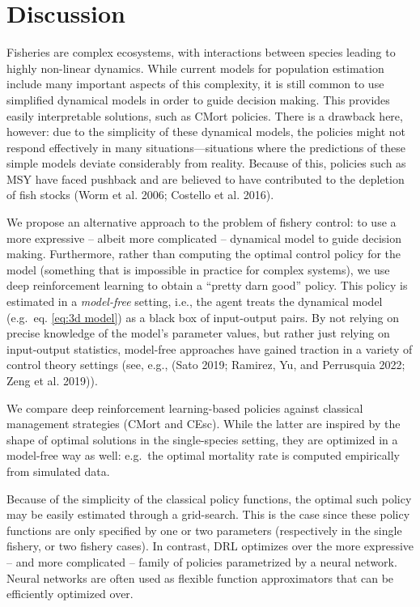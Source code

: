 \documentclass{article}
\begin{document}
\hypertarget{discussion}{%
\section{Discussion}\label{discussion}}

Fisheries are complex ecosystems, with interactions between species
leading to highly non-linear dynamics. While current models for
population estimation include many important aspects of this complexity,
it is still common to use simplified dynamical models in order to guide
decision making. This provides easily interpretable solutions, such as
CMort policies. There is a drawback here, however: due to the simplicity
of these dynamical models, the policies might not respond effectively in
many situations---situations where the predictions of these simple
models deviate considerably from reality. Because of this, policies such
as MSY have faced pushback and are believed to have contributed to the
depletion of fish stocks (Worm et al. 2006; Costello et al. 2016).

We propose an alternative approach to the problem of fishery control: to
use a more expressive -- albeit more complicated -- dynamical model to
guide decision making. Furthermore, rather than computing the optimal
control policy for the model (something that is impossible in practice
for complex systems), we use deep reinforcement learning to obtain a
``pretty darn good'' policy. This policy is estimated in a
\emph{model-free} setting, i.e., the agent treats the dynamical model
(e.g.~eq. \eqref{eq:3d model}) as a black box of input-output pairs. By
not relying on precise knowledge of the model's parameter values, but
rather just relying on input-output statistics, model-free approaches
have gained traction in a variety of control theory settings (see, e.g.,
(Sato 2019; Ramirez, Yu, and Perrusquia 2022; Zeng et al. 2019)).

We compare deep reinforcement learning-based policies against classical
management strategies (CMort and CEsc). While the latter are inspired by
the shape of optimal solutions in the single-species setting, they are
optimized in a model-free way as well: e.g.~the optimal mortality rate
is computed empirically from simulated data.

Because of the simplicity of the classical policy functions, the optimal
such policy may be easily estimated through a grid-search. This is the
case since these policy functions are only specified by one or two
parameters (respectively in the single fishery, or two fishery cases).
In contrast, DRL optimizes over the more expressive -- and more
complicated -- family of policies parametrized by a neural network.
Neural networks are often used as flexible function approximators that
can be efficiently optimized over.
\end{document}
